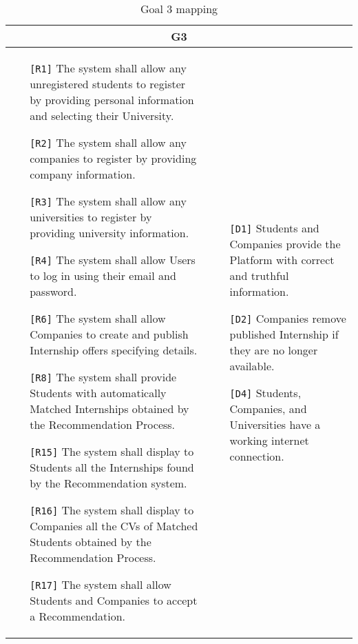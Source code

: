 \begin{table}[H]
    \centering
    \begin{tabular}{|p{8cm}|p{8cm}|}
         \hline
        \multicolumn{2}{|c|}{G3} \\
        \hline
        \begin{itemize}
            \item[\texttt{[R1]}] The system shall allow any unregistered students to register by providing personal information and selecting their University. 
            \item[\texttt{[R2]}] The system shall allow any companies to register by providing company information. 
            \item[\texttt{[R3]}] The system shall allow any universities to register by providing university information. 
            \item[\texttt{[R4]}] The system shall allow Users to log in using their email and password. 
            \item[\texttt{[R6]}] The system shall allow Companies to create and publish Internship offers specifying details.
            \item[\texttt{[R8]}] The system shall provide Students with automatically Matched Internships obtained by the Recommendation Process.
            \item[\texttt{[R15]}] The system shall display to Students all the Internships found by the Recommendation system.
            \item[\texttt{[R16]}] The system shall display to Companies all the CVs of Matched Students obtained by the Recommendation Process.
            \item[\texttt{[R17]}] The system shall allow Students and Companies to accept a Recommendation.
        \end{itemize} & 
        \begin{itemize}
            \item[\texttt{[D1]}] Students and Companies provide the Platform with correct and truthful information.
            \item[\texttt{[D2]}] Companies remove published Internship if they are no longer available.
            \item[\texttt{[D4]}] Students, Companies, and Universities have a working internet connection.
        \end{itemize} \\ \hline
    \end{tabular}
    \caption{Goal 3 mapping}
    \label{tab:G3}
\end{table}

